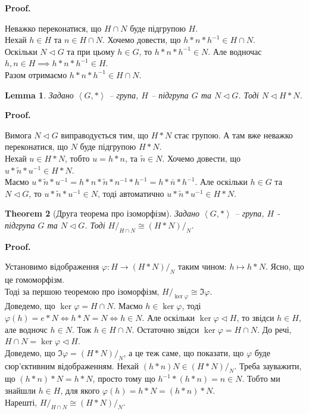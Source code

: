 \documentclass[a4paper, 10pt]{article}
\makeatletter
\theoremstyle{theoremdd}
\newtheorem{theorem}{Theorem}[subsection]
\theoremstyle{theoremdd}
\theoremstyle{theoremdd}
\theoremstyle{theoremdd}
\theoremstyle{theoremdd}
\theoremstyle{theoremdd}
\theoremstyle{theoremdd}
\theoremstyle{theoremdd}
\theoremstyle{theoremdd}
\theoremstyle{theoremdd}
\theoremstyle{theoremdd}
\theoremstyle{theoremdd}
\theoremstyle{theoremdd}
\newtheorem{lemma}[theorem]{Lemma}
\theoremstyle{theoremdd}
\theoremstyle{theoremdd}
\renewenvironment{proof}[1][Proof.\\]{\par
\pushQED{\hfill \qed}%
\normalfont \topsep6\p@\@plus6\p@\relax
\trivlist
\item\relax
{\bfseries
#1\@addpunct{.}}\hspace\labelsep\ignorespaces
}{%
\popQED\endtrivlist\@endpefalse
}
\makeatother
\begin{document}
\begin{proof}
Неважко переконатися, що $H \cap N$ буде підгрупою $H$.\\
Нехай $h \in H$ та $n \in H \cap N$. Хочемо довести, що $h * n * h^{-1} \in H \cap N$.\\
Оскільки $N \triangleleft G$ та при цьому $h \in G$, то $h*n*h^{-1} \in N$. Але водночас $h,n \in H \implies h*n*h^{-1} \in H$.\\
Разом отримаємо $h*n*h^{-1} \in H \cap N$.
\end{proof}
\fi

\begin{lemma}
Задано $\left< G, * \right>$ -- група, $H$ -- підгрупа $G$ та $N \triangleleft G$. Тоді $N \triangleleft H * N$.
\end{lemma}

\begin{proof}
Вимога $N \triangleleft G$ виправодується тим, що $H*N$ стає групою. А там вже неважко переконатися, що $N$ буде підгрупою $H*N$.\\
Нехай $u \in H*N$, тобто $u = h*n$, та $\tilde{n} \in N$. Хочемо довести, що $u*\tilde{n}*u^{-1} \in H*N$.\\
Маємо $u*\tilde{n}*u^{-1} = h*n*\tilde{n}*n^{-1}*h^{-1} = h*\bar{n}*h^{-1}$. Але оскільки $h \in G$ та $N \triangleleft G$, то $u*\tilde{n}*u^{-1} \in N$, тоді автоматично $u*\tilde{n}*u^{-1} \in H*N$.
\end{proof}

\begin{theorem}[Друга теорема про ізоморфізм]
Задано $\left< G, * \right>$ -- група, $H$ - підгрупа $G$ та $N \triangleleft G$. Тоді $H/_{H \cap N} \cong (H*N)/_{N}$.
\end{theorem}

\begin{proof}
Установимо відображення $\varphi \colon H \to (H*N)/_N$ таким чином: $h \mapsto h*N$. Ясно, що це гомоморфізм.\\
Тоді за першою теоремою про ізоморфізм, $H/_{\ker \varphi} \cong \Im \varphi$.\\
Доведемо, що $\ker \varphi = H \cap N$. Маємо $h \in \ker \varphi$, тоді $\varphi(h) = e*N \iff h*N = N \iff h \in N$. Але оскільки $\ker \varphi \triangleleft H$, то звідси $h \in H$, але водночс $h \in N$. Тож $h \in H \cap N$. Остаточно звідси $\ker \varphi = H \cap N$. До речі, $H \cap N = \ker \varphi \triangleleft H$.\\
Доведемо, що $\Im \varphi = (H*N)/_N$, а це теж саме, що показати, що $\varphi$ буде сюр'єктивним відображенням. Нехай $(h*n)N \in (H*N)/_N$. Треба зауважити, що $(h*n)*N = h*N$, просто тому що $h^{-1}*(h*n) = n \in N$. Тобто ми знайшли $h \in H$, для якого $\varphi(h) =h*N = (h*n)*N$.\\
Нарешті, $H/_{H \cap N} \cong (H*N)/_N$.
\end{proof}
\end{document}
